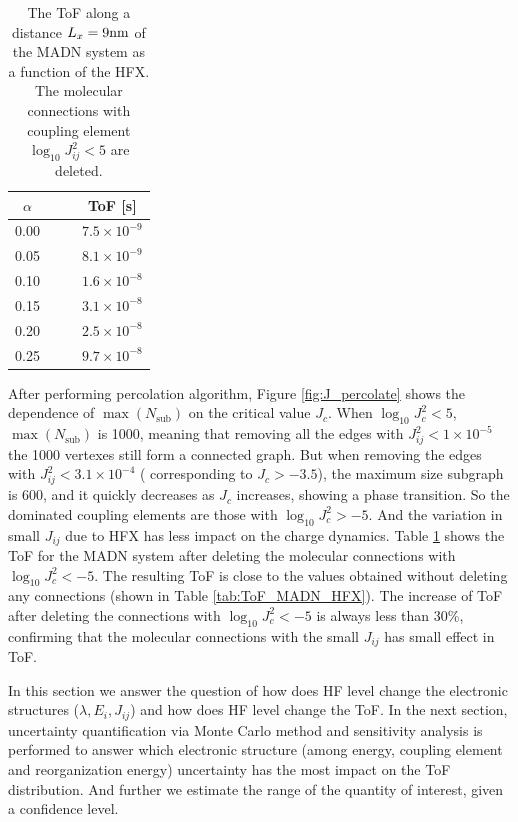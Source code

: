\documentclass[%
 reprint,
superscriptaddress,
 amsmath,amssymb,
 aps,
prb,
floatfix
]{revtex4-2}
\begin{document}
\begin{table}[t]
  \caption{\label{tab:ToF_J} The ToF along a distance $L_x = 9 \unit[]{nm}$  of the MADN system as a function of the HFX. The molecular connections with coupling element $\log_{10} J^2_{ij} < 5$ are deleted.}
  \centering
  \begin{tabular}{c c c c }
  \hline
  \hline
      $\alpha$ & & & ToF [s]  \\
  \hline
      0.00 & & &  $7.5 \times 10^{-9}$ \\
      0.05 & & & $ 8.1 \times 10^{-9}$ \\
      0.10 & & & $ 1.6 \times 10^{-8}$ \\
      0.15 & & & $ 3.1 \times 10^{-8}$ \\
      0.20 & & & $ 2.5 \times 10^{-8}$ \\
      0.25 & & & $ 9.7 \times 10^{-8}$ \\
  \hline
  \hline
  \end{tabular}
\end{table}

After performing percolation algorithm, Figure \ref{fig:J_percolate} shows the dependence of $\max({N_\text{sub}})$ on the critical value $J_c$. When $\log_{10} J_c^2 < 5$, $\max({N_\text{sub}})$ is 1000, meaning that removing all the edges with $J_{ij}^2 < 1 \times 10^{-5}$ the 1000 vertexes still form a connected graph. 
But when removing the edges with $J_{ij}^2 < 3.1 \times 10^{-4}$ ( corresponding to $J_c > -3.5$), the maximum size subgraph is 600, and it quickly decreases as $J_c$ increases, showing a phase transition. 
So the dominated coupling elements are those with $\log_{10} J_c^2 > -5$. 
And the variation in small $J_{ij}$ due to HFX has less impact on the charge dynamics. Table \ref{tab:ToF_J} shows the ToF for the MADN system after deleting the molecular connections with  $\log_{10} J_c^2 < -5$. The resulting ToF is close to the values obtained without deleting any connections (shown in Table \ref{tab:ToF_MADN_HFX}).
The increase of ToF after deleting the connections with  $\log_{10} J_c^2 < -5$ is always less than 30\%, confirming that the molecular connections with the small $J_{ij}$ has small effect in ToF. 

In this section we answer the question of how does HF level change the electronic structures ($\lambda, E_i, J_{ij}$) and 
how does HF level change the ToF. 
In the next section, uncertainty quantification via Monte Carlo method and sensitivity analysis is performed to answer which electronic structure (among energy, coupling element and reorganization energy) uncertainty has the most impact on the ToF distribution. 
And further we estimate the range of the quantity of interest, given a confidence level.
\end{document}
